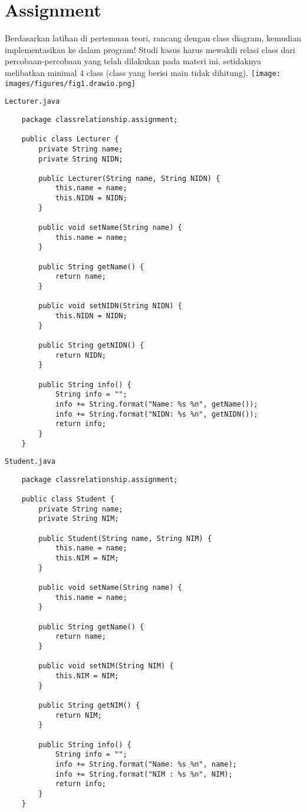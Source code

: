 \documentclass[12pt,titlepage]{article}
\begin{document}
\newpage

\section{Assignment}
\noindent
Berdasarkan latihan di pertemuan teori, rancang dengan class diagram, kemudian implementasikan ke dalam program! Studi kasus harus mewakili relasi class dari percobaan-percobaan yang telah dilakukan pada materi ini, setidaknya melibatkan minimal 4 class (class yang berisi main tidak dihitung).
\newpage
\texttt{[image: images/figures/fig1.drawio.png]}
\newpage

\texttt{Lecturer.java}
\begin{verbatim}
    package classrelationship.assignment;

    public class Lecturer {
        private String name;
        private String NIDN;

        public Lecturer(String name, String NIDN) {
            this.name = name;
            this.NIDN = NIDN;
        }

        public void setName(String name) {
            this.name = name;
        }

        public String getName() {
            return name;
        }

        public void setNIDN(String NIDN) {
            this.NIDN = NIDN;
        }

        public String getNIDN() {
            return NIDN;
        }

        public String info() {
            String info = "";
            info += String.format("Name: %s %n", getName());
            info += String.format("NIDN: %s %n", getNIDN());
            return info;
        }
    }
\end{verbatim}
\texttt{Student.java}
\begin{verbatim}
    package classrelationship.assignment;

    public class Student {
        private String name;
        private String NIM;

        public Student(String name, String NIM) {
            this.name = name;
            this.NIM = NIM;
        }

        public void setName(String name) {
            this.name = name;
        }

        public String getName() {
            return name;
        }

        public void setNIM(String NIM) {
            this.NIM = NIM;
        }

        public String getNIM() {
            return NIM;
        }

        public String info() {
            String info = "";
            info += String.format("Name: %s %n", name);
            info += String.format("NIM : %s %n", NIM);
            return info;
        }
    }
\end{verbatim}
\end{document}
